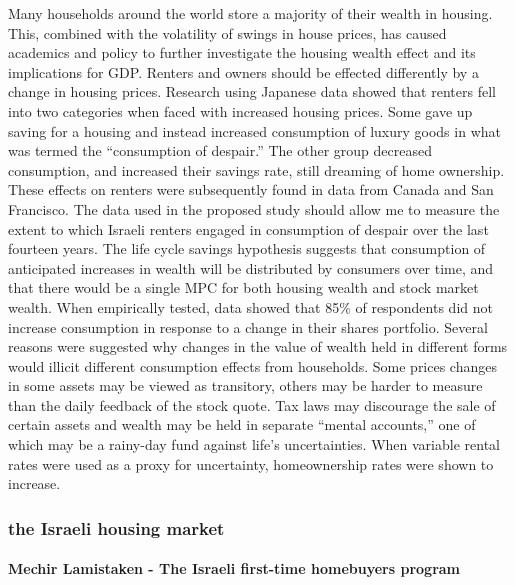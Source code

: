 \documentclass[12pt,a4paper,]{article}
\begin{document}
Many households around the world store a majority of their wealth in
housing. This, combined with the volatility of swings in house prices,
has caused academics and policy to further investigate the housing
wealth effect and its implications for GDP.\autocite{Gan2010} Renters
and owners should be effected differently by a change in housing prices.
Research using Japanese data showed that renters fell into two
categories when faced with increased housing prices. Some gave up saving
for a housing and instead increased consumption of luxury goods in what
was termed the ``consumption of despair.'' The other group decreased
consumption, and increased their savings rate, still dreaming of home
ownership. These effects on renters were subsequently found in data from
Canada and San Francisco.\autocite{Sheiner_1995} The data used in the
proposed study should allow me to measure the extent to which Israeli
renters engaged in consumption of despair over the last fourteen years.
The life cycle savings hypothesis suggests that consumption of
anticipated increases in wealth will be distributed by consumers over
time, and that there would be a single MPC for both housing wealth and
stock market wealth. When empirically tested, data showed that 85\% of
respondents did not increase consumption in response to a change in
their shares portfolio. Several reasons were suggested why changes in
the value of wealth held in different forms would illicit different
consumption effects from households. Some prices changes in some assets
may be viewed as transitory, others may be harder to measure than the
daily feedback of the stock quote. Tax laws may discourage the sale of
certain assets and wealth may be held in separate ``mental accounts,''
one of which may be a rainy-day fund against life's uncertainties. When
variable rental rates were used as a proxy for uncertainty,
homeownership rates were shown to increase.\autocite{CQS2005}

\subsubsection{the Israeli housing
market}\label{the-israeli-housing-market}

\paragraph{Mechir Lamistaken - The Israeli first-time homebuyers
program}\label{mechir-lamistaken---the-israeli-first-time-homebuyers-program}
\end{document}
